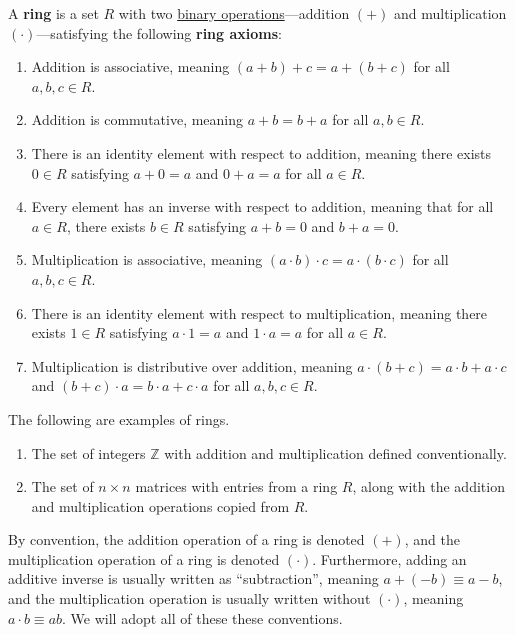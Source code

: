 \documentclass{scrartcl}
\begin{document}
\begin{definition}[Ring]
    \label{def:ring}

    \newcommand{\Z}{\mathbb{Z}}

    A \textbf{ring} is a set $R$ with two \hyperref[def:binary operation]{binary operations}---addition $(+)$ and
    multiplication $(\cdot)$---satisfying the following \textbf{ring axioms}:
    \begin{enumerate}
        \item Addition is associative, meaning $(a+b)+c=a+(b+c)$ for all $a,b,c\in R$.
        \item Addition is commutative, meaning $a+b=b+a$ for all $a,b\in R$.

        \item
            There is an identity element with respect to addition, meaning there exists $0\in R$ satisfying $a+0=a$ and
            $0+a=a$ for all $a\in R$.

        \item
            Every element has an inverse with respect to addition, meaning that for all $a\in R$, there exists $b\in R$
            satisfying $a+b=0$ and $b+a=0$.

        \item Multiplication is associative, meaning $(a\cdot b)\cdot c=a\cdot (b\cdot c)$ for all $a,b,c\in R$.

        \item
            There is an identity element with respect to multiplication, meaning there exists $1\in R$ satisfying
            $a\cdot 1=a$ and $1\cdot a=a$ for all $a\in R$.

        \item
            Multiplication is distributive over addition, meaning $a\cdot (b+c)=a\cdot b+a\cdot c$ and
            $(b+c)\cdot a=b\cdot a+c\cdot a$ for all $a,b,c\in R$.
    \end{enumerate}

    The following are examples of rings.
    \begin{enumerate}
        \item The set of integers $\Z$ with addition and multiplication defined conventionally.
        \item
            The set of $n\times n$ matrices with entries from a ring $R$, along with the addition and multiplication
            operations copied from $R$.
    \end{enumerate}

    By convention, the addition operation of a ring is denoted $(+)$, and the multiplication operation of a ring is
    denoted $(\cdot)$.
    Furthermore, adding an additive inverse is usually written as ``subtraction'', meaning $a+(-b)\equiv a-b$, and the
    multiplication operation is usually written without $(\cdot)$, meaning $a\cdot b\equiv ab$.
    We will adopt all of these these conventions.


\end{definition}
\end{document}
